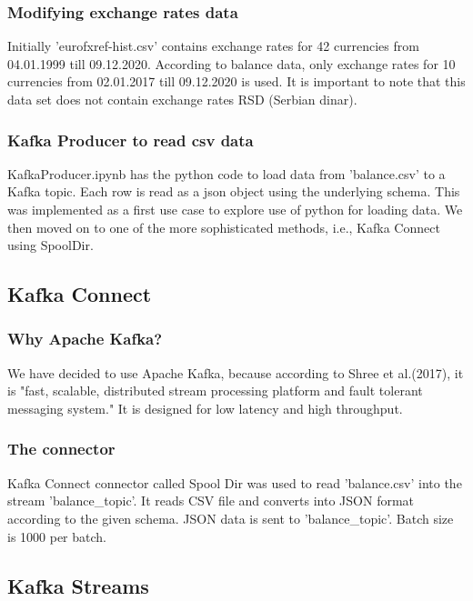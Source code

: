 \documentclass{article}
\begin{document}
\subsubsection{Modifying exchange rates data}

Initially 'eurofxref-hist.csv' contains exchange rates for 42 currencies from 04.01.1999 till 09.12.2020. According to balance data, only exchange rates for 10 currencies from 02.01.2017 till 09.12.2020 is used. It is important to note that this data set does not contain exchange rates RSD (Serbian dinar).

\subsubsection{Kafka Producer to read csv data}

KafkaProducer.ipynb has the python code to load data from 'balance.csv' to a Kafka topic. Each row is read as a json object using the underlying schema. This was implemented as a first use case to explore use of python for loading data. We then moved on to one of the more sophisticated methods, i.e., Kafka Connect using SpoolDir.

\subsection{Kafka Connect}

\subsubsection{Why Apache Kafka?}

We have decided to use Apache Kafka, because according to Shree et al.(2017), it is "fast, scalable, distributed stream processing platform and fault tolerant messaging system." It is designed for low latency and high throughput\cite{shree}.

\subsubsection{The connector}
Kafka Connect connector called Spool Dir was used to read 'balance.csv' into the stream 'balance\_topic'. It reads CSV file and converts into JSON format according to the given schema. JSON data is sent to 'balance\_topic'. Batch size is 1000 per batch.

\subsection{Kafka Streams}
\end{document}
